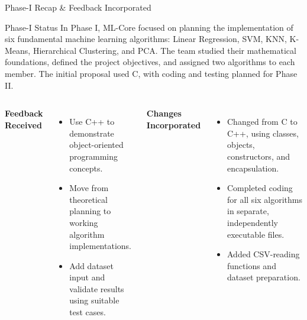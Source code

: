 \documentclass[aspectratio=169,11pt]{beamer}
\begin{document}
\begin{frame}{Phase-I Recap \& Feedback Incorporated}
\begin{block}{Phase-I Status}
\footnotesize
In Phase I, ML-Core focused on planning the implementation of six fundamental machine learning algorithms: Linear Regression, SVM, KNN, K-Means, Hierarchical Clustering, and PCA. The team studied their mathematical foundations, defined the project objectives, and assigned two algorithms to each member. The initial proposal used C, with coding and testing planned for Phase II.
\end{block}

\vspace{2mm}

\begin{columns}[T,totalwidth=\textwidth]
\textbf{\color{GEUBlue}Feedback Received}
\begin{itemize}\itemsep2pt
\footnotesize
\item Use C++ to demonstrate object-oriented programming concepts.
\item Move from theoretical planning to working algorithm implementations.
\item Add dataset input and validate results using suitable test cases.
\end{itemize}

\textbf{\color{GEUBlue}Changes Incorporated}
\begin{itemize}\itemsep2pt
\footnotesize
\item Changed from C to C++, using classes, objects, constructors, and encapsulation.
\item Completed coding for all six algorithms in separate, independently executable files.
\item Added CSV-reading functions and dataset preparation.
\end{itemize}
\end{columns}
\end{frame}
\end{document}
